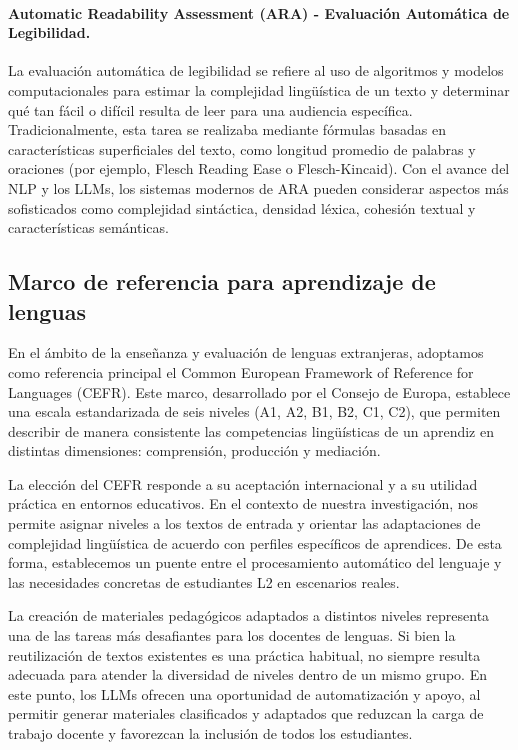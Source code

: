 \paragraph{Automatic Readability Assessment (ARA) - Evaluación Automática de Legibilidad.\parencite{Feng2010}}
La evaluación automática de legibilidad se refiere al uso de algoritmos y modelos computacionales para estimar la complejidad lingüística de un texto y determinar qué tan fácil o difícil resulta de leer para una audiencia específica. Tradicionalmente, esta tarea se realizaba mediante fórmulas basadas en características superficiales del texto, como longitud promedio de palabras y oraciones (por ejemplo, Flesch Reading Ease\parencite{Flesch1948} o Flesch-Kincaid\parencite{Kincaid1975}). Con el avance del NLP y los LLMs, los sistemas modernos de ARA pueden considerar aspectos más sofisticados como complejidad sintáctica, densidad léxica, cohesión textual y características semánticas.

\subsection{Marco de referencia para aprendizaje de lenguas} \label{subsec:aprend_leng}
En el ámbito de la enseñanza y evaluación de lenguas extranjeras, adoptamos como referencia principal el Common European Framework of Reference for Languages (CEFR). Este marco, desarrollado por el Consejo de Europa, establece una escala estandarizada de seis niveles (A1, A2, B1, B2, C1, C2), que permiten describir de manera consistente las competencias lingüísticas de un aprendiz en distintas dimensiones: comprensión, producción y mediación.

La elección del CEFR responde a su aceptación internacional y a su utilidad práctica en entornos educativos. En el contexto de nuestra investigación, nos permite asignar niveles a los textos de entrada y orientar las adaptaciones de complejidad lingüística de acuerdo con perfiles específicos de aprendices. De esta forma, establecemos un puente entre el procesamiento automático del lenguaje y las necesidades concretas de estudiantes L2 en escenarios reales.

La creación de materiales pedagógicos adaptados a distintos niveles representa una de las tareas más desafiantes para los docentes de lenguas. Si bien la reutilización de textos existentes es una práctica habitual, no siempre resulta adecuada para atender la diversidad de niveles dentro de un mismo grupo. En este punto, los LLMs ofrecen una oportunidad de automatización y apoyo, al permitir generar materiales clasificados y adaptados que reduzcan la carga de trabajo docente y favorezcan la inclusión de todos los estudiantes.

